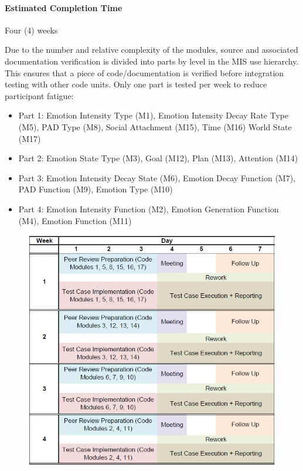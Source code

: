 \paragraph{Estimated Completion Time} Four (4) weeks

Due to the number and relative complexity of the modules, source and associated
documentation verification is divided into parts by level in the MIS use
hierarchy. This ensures that a piece of code/documentation is verified before
integration testing with other code units. Only one part is tested per week to
reduce participant fatigue:
\begin{itemize}

    \item Part 1: Emotion Intensity Type (M1), Emotion Intensity Decay Rate
    Type (M5), PAD Type (M8), Social Attachment (M15), Time (M16) World State
    (M17)

    \item Part 2: Emotion State Type (M3), Goal (M12), Plan (M13), Attention
    (M14)

    \item Part 3: Emotion Intensity Decay State (M6), Emotion Decay Function
    (M7), PAD Function (M9), Emotion Type (M10)

    \item Part 4: Emotion Intensity Function (M2), Emotion Generation Function
    (M4), Emotion Function (M11)

\end{itemize}

\begin{figure}[!h]
    \centering
    \includegraphics[width=0.9\linewidth]{figures/Implement_Schedule.png}
\end{figure}